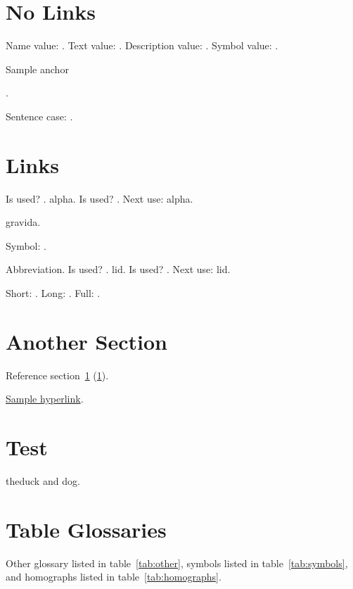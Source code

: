 \documentclass[draft]{article}
\begin{document}
\tableofcontents

\printunsrtglossary

\section{No Links}
\label{sec:nolinks}
Name value: .
Text value: .
Description value: .
Symbol value: .

\hypertarget{sampleanchor}{Sample anchor}.

Sentence case: .

\section{Links}
\label{sec:links}

Is used? .
\gls{alpha}.
Is used? .
Next use: \gls{alpha}.

\Gls{gravida}.

Symbol: .

Abbreviation. 
Is used? .
\gls{lid}.
Is used? .
Next use: \gls{lid}.

Short: .
Long: .
Full: .

\section{Another Section}
\label{sec:another}

Reference section~\ref{sec:nolinks} (\ref*{sec:nolinks}).

\hyperlink{sampleanchor}{Sample hyperlink}.

\lipsum

\section{Test}

\gls{theduck} and \gls{dog}.

\printunsrtglossary[type=test,title={Test}]

\section{Table Glossaries}
\label{sec:table}

Other glossary listed in table~\ref{tab:other},
symbols listed in table~\ref{tab:symbols},
and homographs listed in table~\ref{tab:homographs}.

\printunsrttable[label={tab:other},type=other,
 block-style=name,par=ragged,other=useri]

\printunsrttable[label={tab:symbols},type=symbols,
 block-style=name-symbol-desc,par=ragged]

\printunsrttable[label={tab:homographs},type=homographs,
 block-style=name-desc,par=ragged]
\end{document}
